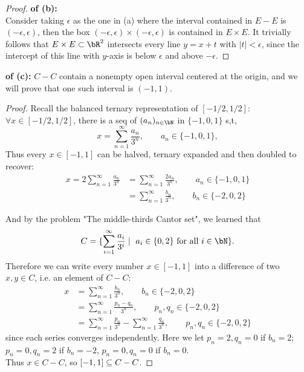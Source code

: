 \documentclass[lang=cn,11pt]{elegantbook}
\begin{document}
\begin{proof}
    \textbf{of (b):}\\
    Consider taking $\epsilon$ as the one in (a) where the interval contained in $E-E$ is $(-\epsilon, \epsilon)$, then the box $(-\epsilon, \epsilon) \times (-\epsilon, \epsilon)$ is contained in $E\times E$. It trivially follows that $E\times E\subset\bR^2$ intersects every line $y=x+t$ with $|t|<\epsilon$, since the intercept of this line with $y$-axis is below $\epsilon$ and above $-\epsilon$.
\end{proof}

\begin{solution}
        \textbf{of (c):} $C-C$ contain a nonempty open interval centered at the origin, and we will prove that one such interval is $(-1,1)$.
\begin{proof}
Recall the balanced ternary representation of $[-1/2, 1/2]$: $\forall x\in [-1/2, 1/2]$, there is a seq of $(a_n)_{n\in\bN} $ in $\{-1,0,1\}$ s,t,
\[
x=\sum_{n=1}^\infty \frac{a_n}{3^n},\qquad a_n\in\{-1,0,1\},
\]
Thus every $x\in [-1,1]$ can be halved, ternary expanded and then doubled to recover:
\begin{align}
    x=2\sum_{n=1}^\infty \frac{a_n}{3^n} &= \sum_{n=1}^\infty \frac{2a_n}{3^n},\qquad a_n\in\{-1,0,1\} \\
    &= \sum_{n=1}^\infty \frac{b_n}{3^n},\qquad b_n\in\{-2,0,2\} 
\end{align}

And by the problem "The middle-thirds Cantor set", we learned that \[
    C=\{ \sum_{i=1}^\infty \frac{a_i}{3^i} \mid \text{ $a_i\in \{0,2\}$ for all $i\in \bN$} \}.
  \]
Therefore we can write every number $x \in [-1, 1]$ into a difference of two $x,y \in C$, i.e. an element of $C-C$:
\begin{align}
    x &= \sum_{n=1}^\infty \frac{b_n}{3^n},\qquad b_n\in\{-2,0,2\} \\
    &= \sum_{n=1}^\infty \frac{p_n-q_n}{3^n},\qquad p_n,q_n\in\{-2,0,2\}\\
    &= \sum_{n=1}^\infty \frac{p_n}{3^n} - \sum_{n=1}^\infty \frac{q_n}{3^n},\qquad p_n,q_n\in\{-2,0,2\}
\end{align}
since each series converges independently. Here we let $p_n = 2, q_n = 0$ if $b_n = 2$; $p_n = 0, q_n = 2$ if $b_n = -2$, $p_n = 0, q_n = 0$ if $b_n = 0$.\\
Thus $x \in C-C$, so $[-1,1] \subseteq C-C$.
\end{proof}

\end{solution}
\end{document}
